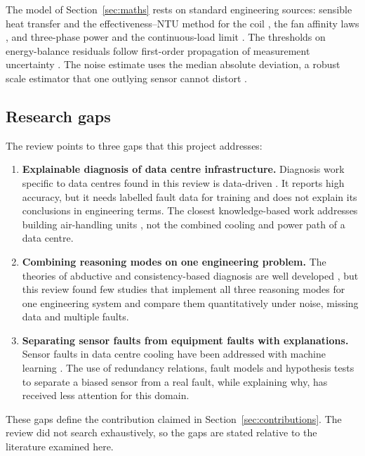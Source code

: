The model of Section~\ref{sec:maths} rests on standard engineering sources: sensible heat transfer and the effectiveness--NTU method for the coil \parencite{incropera2011}, the fan affinity laws \parencite{ashraehvac2020}, and three-phase power and the continuous-load limit \parencite{nfpa702023}. The thresholds on energy-balance residuals follow first-order propagation of measurement uncertainty \parencite{jcgm2008}. The noise estimate uses the median absolute deviation, a robust scale estimator that one outlying sensor cannot distort \parencite{rousseeuw1993}.

\subsection{Research gaps}

The review points to three gaps that this project addresses:
\begin{enumerate}
  \item \textbf{Explainable diagnosis of data centre infrastructure.} Diagnosis work specific to data centres found in this review is data-driven \parencite{asgari2021,wang2024}. It reports high accuracy, but it needs labelled fault data for training and does not explain its conclusions in engineering terms. The closest knowledge-based work addresses building air-handling units \parencite{house2001,schein2006}, not the combined cooling and power path of a data centre.
  \item \textbf{Combining reasoning modes on one engineering problem.} The theories of abductive and consistency-based diagnosis are well developed \parencite{reiter1987,peng1990,console1991}, but this review found few studies that implement all three reasoning modes for one engineering system and compare them quantitatively under noise, missing data and multiple faults.
  \item \textbf{Separating sensor faults from equipment faults with explanations.} Sensor faults in data centre cooling have been addressed with machine learning \parencite{wang2024}. The use of redundancy relations, fault models and hypothesis tests to separate a biased sensor from a real fault, while explaining why, has received less attention for this domain.
\end{enumerate}
These gaps define the contribution claimed in Section~\ref{sec:contributions}. The review did not search exhaustively, so the gaps are stated relative to the literature examined here.

